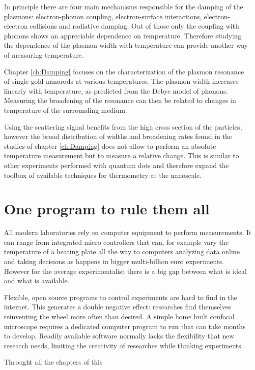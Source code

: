 In principle there are four main mechanisms responsible for the damping of
the plasmons: electron-phonon coupling, electron-surface interactions,
electron-electron collisions and radiative damping. Out of those only the
coupling with phonons shows an appreciable dependence on temperature. Therefore
studying the dependence of the plasmon width with temperature can provide
another way of measuring temperature.

Chapter \ref{ch:Damping} focuses on the characterization of the plasmon
resonance of single gold nanorods at various temperatures. The plasmon width
increases linearly with temperature, as predicted from the Debye model of
phonons. Measuring the broadening of the resonance can then be related to
changes in temperature of the surrounding medium. 

Using the scattering signal benefits from the high cross section of the
particles; however the broad distribution of widths and broadening rates found
in the studies of chapter \ref{ch:Damping} does not allow to perform an absolute
temperature measurement but to measure a relative change. This is similar to
other experiments performed with quantum dots and therefore expand the toolbox
of available techniques for thermometry at the nanoscale. 

\section{One program to rule them all}
All modern laboratories rely on computer equipment to perform measurements. It
can range from integrated micro controllers that can, for example vary the
temperature of a heating plate all the way to computers analyzing data online
and taking decisions as happens in bigger multi-billion euro experiments.
However for the average experimentalist there is a big gap between what is ideal
and what is available. 

Flexible, open source programs to control experiments are hard to find in the
internet. This generates a double negative effect: researches find themselves
reinventing the wheel more often than desired. A simple home built confocal
microscope requires a dedicated computer program to run that can take months to
develop. Readily available software normally lacks the flexibility that new
research needs, limiting the creativity of researches while thinking
experiments.

Throught all the chapters of this
